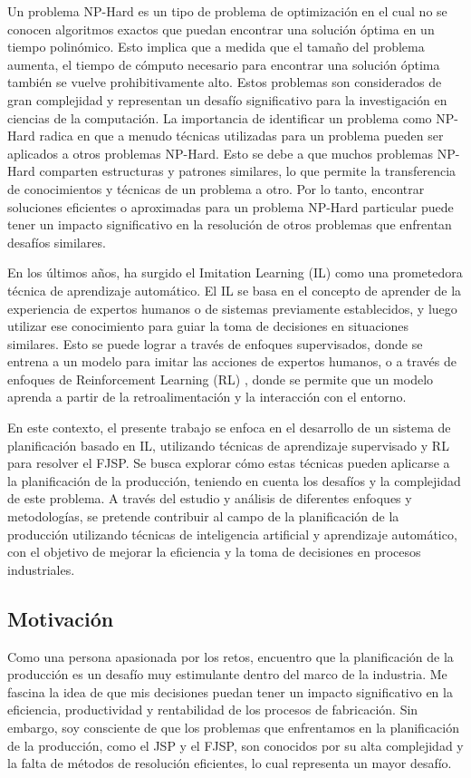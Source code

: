 Un problema NP-Hard es un tipo de problema de optimización en el cual no se conocen algoritmos 
exactos que puedan encontrar una solución óptima en un tiempo polinómico. Esto implica que a 
medida que el tamaño del problema aumenta, el tiempo de cómputo necesario para encontrar una 
solución óptima también se vuelve prohibitivamente alto. Estos problemas son considerados de 
gran complejidad y representan un desafío significativo para la investigación en ciencias de 
la computación. La importancia de identificar un problema como NP-Hard radica en que a menudo 
técnicas utilizadas para un problema pueden ser aplicados a otros problemas NP-Hard. Esto se debe a que 
muchos problemas NP-Hard comparten estructuras y patrones similares, lo que permite la 
transferencia de conocimientos y técnicas de un problema a otro. Por lo tanto, encontrar 
soluciones eficientes o aproximadas para un problema NP-Hard particular puede tener un impacto 
significativo en la resolución de otros problemas que enfrentan desafíos similares.\medskip

En los últimos años, ha surgido el Imitation Learning (IL) \cite{SmartLab_2019} como una 
prometedora técnica de aprendizaje automático. El IL se basa en el concepto de aprender 
de la experiencia de expertos humanos o de sistemas previamente establecidos, y luego utilizar 
ese conocimiento para guiar la toma de decisiones en situaciones similares. Esto se puede lograr 
a través de enfoques supervisados, donde se entrena a un modelo para imitar las acciones de 
expertos humanos, o a través de enfoques de Reinforcement Learning (RL) \cite{Bhatt_2018}, 
donde se permite que un modelo aprenda a partir de la retroalimentación y la interacción 
con el entorno.\medskip

En este contexto, el presente trabajo se enfoca en el desarrollo de un sistema de planificación 
basado en IL, utilizando técnicas de aprendizaje supervisado y RL para resolver el FJSP. 
Se busca explorar cómo estas técnicas pueden aplicarse a la planificación de la producción, teniendo 
en cuenta los desafíos y la complejidad de este problema. A través del estudio y análisis de 
diferentes enfoques y metodologías, se pretende contribuir al campo de la planificación de la 
producción utilizando técnicas de inteligencia artificial y aprendizaje automático, con el objetivo 
de mejorar la eficiencia y la toma de decisiones en procesos industriales.

\subsection{Motivación}
Como una persona apasionada por los retos, encuentro que la planificación de la producción es un desafío 
muy estimulante dentro del marco de la industria. Me fascina la idea de que mis decisiones puedan tener un 
impacto significativo en la eficiencia, productividad y rentabilidad de los procesos de fabricación. Sin embargo, 
soy consciente de que los problemas que enfrentamos en la planificación de la producción, como el JSP y el FJSP, 
son conocidos por su alta complejidad y la falta de métodos de resolución eficientes, lo cual representa 
un mayor desafío.\medskip


